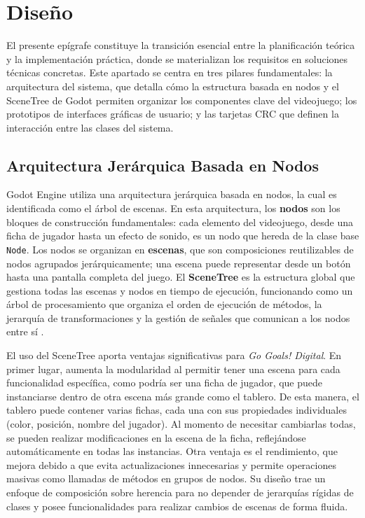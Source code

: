 \section{Diseño}
\label{sec:diseno}

El presente epígrafe constituye la transición esencial entre la planificación teórica y la implementación práctica, donde se materializan los requisitos en soluciones técnicas concretas. Este apartado se centra en tres pilares fundamentales: la arquitectura del sistema, que detalla cómo la estructura basada en nodos y el SceneTree de Godot permiten organizar los componentes clave del videojuego; los prototipos de interfaces gráficas de usuario; y las tarjetas CRC que definen la interacción entre las clases del sistema.

\subsection{Arquitectura Jerárquica Basada en Nodos}
\label{subsec:arquitectura}

Godot Engine utiliza una arquitectura jerárquica basada en nodos, la cual es identificada como el árbol de escenas. En esta arquitectura, los \textbf{nodos} son los bloques de construcción fundamentales: cada elemento del videojuego, desde una ficha de jugador hasta un efecto de sonido, es un nodo que hereda de la clase base \texttt{Node}. Los nodos se organizan en \textbf{escenas}, que son composiciones reutilizables de nodos agrupados jerárquicamente; una escena puede representar desde un botón hasta una pantalla completa del juego. El \textbf{SceneTree} es la estructura global que gestiona todas las escenas y nodos en tiempo de ejecución, funcionando como un árbol de procesamiento que organiza el orden de ejecución de métodos, la jerarquía de transformaciones y la gestión de señales que comunican a los nodos entre sí \parencite{GodotDocs2026}.

El uso del SceneTree aporta ventajas significativas para \textit{Go Goals! Digital}. En primer lugar, aumenta la modularidad al permitir tener una escena para cada funcionalidad específica, como podría ser una ficha de jugador, que puede instanciarse dentro de otra escena más grande como el tablero. De esta manera, el tablero puede contener varias fichas, cada una con sus propiedades individuales (color, posición, nombre del jugador). Al momento de necesitar cambiarlas todas, se pueden realizar modificaciones en la escena de la ficha, reflejándose automáticamente en todas las instancias. Otra ventaja es el rendimiento, que mejora debido a que evita actualizaciones innecesarias y permite operaciones masivas como llamadas de métodos en grupos de nodos. Su diseño trae un enfoque de composición sobre herencia para no depender de jerarquías rígidas de clases y posee funcionalidades para realizar cambios de escenas de forma fluida.

